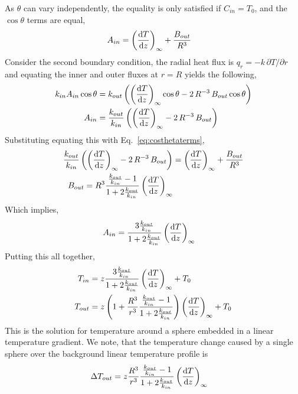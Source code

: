 \documentclass{article}
\begin{document}
As $\theta$ can vary independently, the equality is only satisfied if
$C_{in}=T_0$, and the $\cos\theta$ terms are equal,
\begin{align}\label{eq:costhetaterms}
  A_{in} &= \left(\frac{{\rm d}T}{{\rm d}
  z}\right)_{\infty} +  \frac{B_{out}}{R^{3}}
\end{align}
Consider the second boundary condition, the radial heat flux is
$q_r=-k\,\partial T/\partial r$ and equating the inner and outer
fluxes at $r=R$ yields the following,
\begin{align}
  k_{in} A_{in} \cos \theta &= k_{out}\left(\left(\frac{{\rm d}T}{{\rm d}
                              z}\right)_{\infty} \cos \theta -2\,R^{-3}\,B_{out}\cos{\theta}\right)
  \\
   A_{in} &= \frac{k_{out}}{k_{in}}\left(\left(\frac{{\rm d}T}{{\rm d}
                  z}\right)_{\infty} -2\,R^{-3}\,B_{out}\right)
\end{align}
Substituting equating this with Eq.~\ref{eq:costhetaterms},
\begin{align}
\frac{k_{out}}{k_{in}}\left(\left(\frac{{\rm d}T}{{\rm d}
                  z}\right)_{\infty} -2\,R^{-3}\,B_{out}\right) &= \left(\frac{{\rm d}T}{{\rm d}
                                                                  z}\right)_{\infty} +  \frac{B_{out}}{R^{3}}
  \\
  B_{out} = R^3\frac{\frac{k_{out}}{k_{in}}-1}{1+2\frac{k_{out}}{k_{in}}}\left(\frac{{\rm d}T}{{\rm d}
                  z}\right)_{\infty}
\end{align}
Which implies,
\begin{align}
  A_{in} &= \frac{3\frac{k_{out}}{k_{in}}}{1+2\frac{k_{out}}{k_{in}}}\left(\frac{{\rm d}T}{{\rm d} z}\right)_{\infty}
\end{align}
Putting this all together,
\begin{align}
  T_{in} &= z\frac{3\frac{k_{out}}{k_{in}}}{1+2\frac{k_{out}}{k_{in}}}\left(\frac{{\rm d}T}{{\rm d} z}\right)_{\infty}+ T_0
  \\
  T_{out} &=z\left(1 +  \frac{R^3}{r^{3}}\frac{\frac{k_{out}}{k_{in}}-1}{1+2\frac{k_{out}}{k_{in}}}\right)\left(\frac{{\rm d}T}{{\rm d}
                  z}\right)_{\infty}  + T_0
\end{align}
This is the solution for temperature around a sphere embedded in a
linear temperature gradient. We note, that the temperature change
caused by a single sphere over the background linear temperature profile is
\begin{align*}
\Delta T_{out} &=z\frac{R^3}{r^{3}}\frac{\frac{k_{out}}{k_{in}}-1}{1+2\frac{k_{out}}{k_{in}}}\left(\frac{{\rm d}T}{{\rm d}z}\right)_{\infty}
\end{align*}
\end{document}

